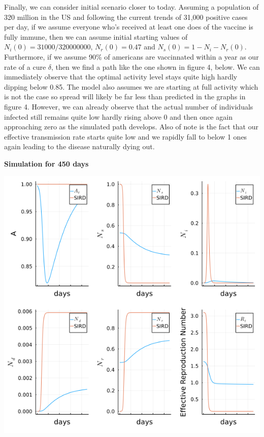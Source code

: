 \documentclass[12pt]{article}
\begin{document}
Finally, we can consider initial scenario closer to today. Assuming a population of 320 million in the US and following the current trends of 31,000 positive cases per day, 
if we assume everyone who's received at least one does of the vaccine is fully immune, then we can assume initial starting values of $N_i(0) = 31000/320000000$, $N_r(0) = 0.47$ and  $N_s(0) = 1 - N_i - N_r(0)$.
Furthermore, if we assume 90\% of americans are vaccinnated within a year as our rate of a cure $\delta$, then we find a path like the one shown in figure 4, below. We can immediately observe that the optimal
activity level stays quite high hardly dipping below 0.85. The model also assumes we are starting at full activity which is not the case so spread will likely be far less than predicted in the graphs in 
figure 4. However, we can already observe that the actual number of individuals infected still remains quite low hardly rising above 0 and then once again approaching zero as the simulated path develops. 
Also of note is the fact that our effective transmission rate starts quite low and we rapidly fall to below 1 ones again leading to the disease naturally dying out.

\begin{center}
	\textbf{Simulation for 450 days}\par\medskip
	\includegraphics[width = \textwidth]{../plots/plots2.png}
	\par\medskip
	\label{fig:figure1_2}
\end{center}
\end{document}
